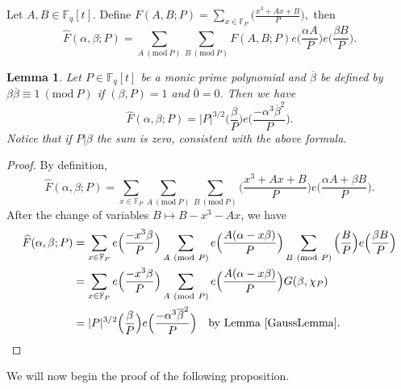 \documentclass[12pt,reqno]{amsart}
\newcommand{\Mod}[1]{\ (\mathrm{mod}\ #1)}
\newcommand{\BF}{\mathbb{F}}
\newtheorem{lem}{Lemma}[subsection]
\begin{document}
Let $A,B \in \BF_{q}[t]$. Define $F(A,B;P) = \sum\limits_{x \in \BF_{P}} \Big ( \frac{x^3+Ax +B}{P} \Big ),$ then  
   $$ 
   \widehat{F}(\alpha, \beta; P) =  \sum\limits_{A \Mod P} \sum\limits_{B \Mod P} F(A,B;P) e\Big (\frac{\alpha A}{P}\Big ) e\Big (\frac{\beta B}{P}\Big ).
   $$

\begin{lem}\label{matthewsformula}
    Let $P \in \BF_{q}[t]$ be a monic prime polynomial and $\overline{\beta}$ be defined by $\beta\overline{\beta} \equiv 1 \Mod P $ if $(\beta,P)=1$ and $\overline{0}=0$. Then we have
    $$
    \widehat{F}(\alpha, \beta; P) =  |P|^{3/2} \Big ( \frac{\beta}{P} \Big ) e\Big ( \frac{-\alpha^3\overline{\beta}^2}{P} \Big ). 
    $$
    Notice that if $P | \beta$ the sum is zero, consistent with the above formula.
\end{lem}

\begin{proof}
    By definition,
    \[
\widehat{F}(\alpha, \beta; P) = \sum\limits_{x \in \BF_{P}} \sum\limits_{A \Mod P} \sum\limits_{B \Mod P} \Big ( \frac{x^3+Ax +B}{P} \Big )  e\Big (\frac{\alpha A + \beta B}{P}\Big ).
    \]
    After the change of variables $B \mapsto B -x^3 - Ax$, we have
    \begin{align*}
\widehat{F}(\alpha, \beta; P) &= \sum\limits_{x \in \BF_{P}} e \Big (\frac{-x^3 \beta}{P} \Big) \sum\limits_{A \Mod P} e\Big ( \frac{A (\alpha - x \beta)}{P} \Big ) \sum\limits_{B \Mod P} \Big ( \frac{B}{P} \Big ) e \Big (\frac{\beta B}{P} \Big ) \\
&= \sum\limits_{x \in \BF_{P}} e \Big (\frac{-x^3 \beta}{P} \Big) \sum\limits_{A \Mod P} e\Big ( \frac{A (\alpha - x \beta)}{P} \Big ) G(\beta, \chi_{P}) \\
&= |P|^{3/2}\Big (\frac{\beta}{P} \Big) e\Big ( \frac{-\alpha^3\overline{\beta}^2}{P} \Big ) \ \ \   \text{by Lemma \ref{GaussLemma}. }
    \end{align*}
\end{proof}

We will now begin the proof of the following proposition. 
\end{document}
